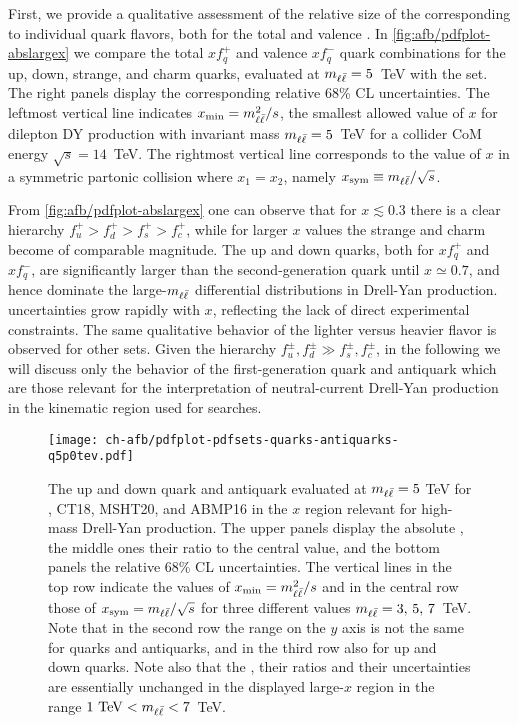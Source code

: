 First, we provide a qualitative assessment of the relative size of the
\pdfs corresponding to
individual quark flavors, both for the total and valence \pdfs.
In \cref{fig:afb/pdfplot-abslargex} we
compare  the total $xf^+_q$ and valence $xf_q^-$  quark
   \pdf combinations for the up, down, strange, and charm quarks,
   evaluated at $m_{\ell\bar{\ell}}=5$~TeV with the  \nnlo \pdf set.
   The right panels display the corresponding relative 68\% CL uncertainties.
  The leftmost vertical line indicates $x_{\rm min}=m_{\ell\bar{\ell}}^2/s$, the
  smallest allowed value of $x$ 
   for dilepton DY production with invariant mass $m_{\ell\bar{\ell}}=5$~TeV for a collider
   CoM energy $\sqrt{s}=14$~TeV.
   The rightmost vertical line corresponds to
   the value of $x$ in a symmetric partonic collision where $x_1=x_2$, namely
   $x_{\rm  sym}\equiv m_{\ell\bar{\ell}}/\sqrt{s}$.

   From \cref{fig:afb/pdfplot-abslargex} one can observe that for
   $x\lesssim 0.3$ there is a clear hierarchy
$f_u^+>f_d^+ >f_s^+>f_c^+$, while for larger $x$ values the
   strange and charm \pdfs become of comparable magnitude.
   The up and down quarks, both for $xf^+_q$ and $xf^-_q$, are significantly larger
   than the second-generation quark \pdfs until $x\simeq 0.7$, and hence dominate the
   large-$m_{\ell\bar{\ell}}$ differential distributions in Drell-Yan production.
%
\pdf uncertainties grow rapidly with $x$, reflecting the lack
of direct experimental constraints.
%
The same qualitative behavior of the lighter versus heavier flavor \pdfs
is observed for other \pdf sets.
%
Given the hierarchy $f_u^\pm, f_d^\pm \gg f_s^\pm, f_c^\pm $, in the following
we will discuss only the behavior of the first-generation quark
and antiquark \pdfs which are those relevant for the interpretation
of neutral-current Drell-Yan production in the kinematic region used
for \bsm searches. 
      


\begin{figure}[!t]
 \centering
 \texttt{[image: ch-afb/pdfplot-pdfsets-quarks-antiquarks-q5p0tev.pdf]}
 \caption{\small The up and down quark and antiquark \pdfs evaluated at $m_{\ell\bar{\ell}}=5$ TeV
   for , CT18, MSHT20, and ABMP16 in the $x$ region relevant for
   high-mass Drell-Yan production. The upper panels display the absolute \pdfs,
   the middle ones their ratio to the central  value, and the bottom panels
   the relative 68\% CL uncertainties.
   The vertical lines in the top
   row indicate the values of  $x_{\rm min}=m_{\ell\bar{\ell}}^2/s$ and in the central
   row those of $x_{\rm  sym}=m_{\ell\bar{\ell}}/\sqrt{s}$
   for three
   different values  $m_{\ell\bar{\ell}}=3,\,5,\,7$~TeV.
   Note that in the second row the
   range on the $y$ axis is not the same for quarks and antiquarks,
   and in the third row also for up and down quarks.
   Note also that the
   \pdfs, their ratios and their uncertainties are essentially
   unchanged in the displayed large-$x$ region in the range $1~{\rm TeV}<m_{\ell\bar{\ell}}<7$~TeV.
}    
 \label{fig:afb/mll_dep_pdfs}
\end{figure}

